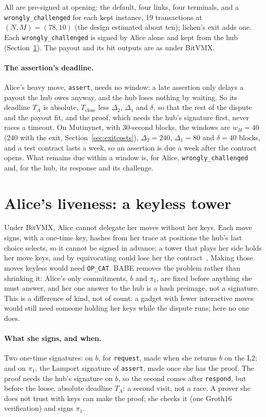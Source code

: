 \documentclass[11pt]{article}
\newcommand{\Tc}{T_{\mathrm{close}}}
\newcommand{\tx}[1]{\texttt{#1}}
\begin{document}
All are pre-signed at opening: the default, four links, four terminals,
and a \tx{wrongly\_challenged} for each kept instance, 19 transactions at
$(N, M) = (78, 10)$ (the design estimated about ten); lichen's exit adds
one. Each
\tx{wrongly\_\allowbreak challenged} is signed by Alice alone and kept from the hub
(Section~\ref{sec:tower}). The payout and its bit outputs are as under
BitVMX.

\paragraph{The assertion's deadline.} Alice's heavy move, \tx{assert},
needs no window: a late assertion only delays a payout the hub owes
anyway, and the hub loses nothing by waiting. So its deadline $T_A$ is
absolute, $\Tc$ less $\Delta_2$, $\Delta_1$ and $\delta$, so that the
rest of the dispute and the payout fit, and the proof, which needs the
hub's signature first, never races a timeout. On Mutinynet, with
30-second blocks, the windows are $w_H = 40$ (240 with the exit,
Section~\ref{sec:exitcosts}), $\Delta_2 = 240$,
$\Delta_1 = 80$ and $\delta = 40$ blocks, and a test contract lasts a
week, so an assertion is due a week after the contract opens. What
remains due within a window is, for Alice, \tx{wrongly\_challenged} and,
for the hub, its response and its challenge.

\section{Alice's liveness: a keyless tower}
\label{sec:tower}

Under BitVMX, Alice cannot delegate her moves without her keys. Each move
signs, with a one-time key, hashes from her trace at positions the hub's
last choice selects, so it cannot be signed in advance; a tower that
plays her side holds her move keys, and by equivocating could lose her
the contract~\cite[\S 10]{lichenbitvmx}. Making those moves keyless would
need \texttt{OP\_CAT}. BABE removes the problem rather than shrinking
it: Alice's only commitments, $b$ and $\pi_1$, are fixed before anything
she must answer, and her one answer to the hub is a hash preimage, not a
signature. This is a difference of kind, not of count: a gadget with
fewer interactive moves would still need someone holding her keys while
the dispute runs; here no one does.

\paragraph{What she signs, and when.} Two one-time signatures: on $b$,
for \tx{request}, made when she returns $b$ on the L2; and on $\pi_1$,
the Lamport signature of \tx{assert}, made once she has the proof. The
proof needs the hub's signature on $b$, so the second comes after
\tx{respond}, but before the loose, absolute deadline $T_A$: a second
visit, not a race. A prover she does not trust with keys can make the
proof; she checks it (one Groth16 verification) and signs $\pi_1$.
\end{document}
